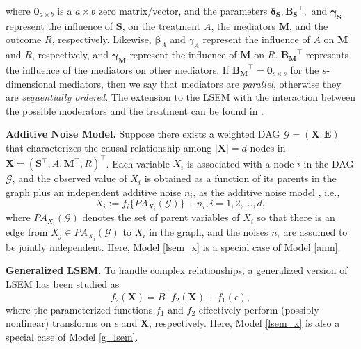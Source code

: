 where $\boldsymbol{0}_{a\times b}$ is a $a\times b$ zero matrix/vector, and the parameters $\boldsymbol{\delta_S},\boldsymbol{B_S}^\top,$ and $\boldsymbol{\gamma_S}$ represent the influence of $\boldsymbol{S}$, on the treatment $A$, the mediators $\boldsymbol{M}$, and the outcome $R$, respectively. Likewise, $\boldsymbol{\beta}_A$ and $\gamma_A$ represent the influence of $A$ on $\boldsymbol{M}$ and $R$, respectively, and $\boldsymbol{\gamma_M}$ represent the influence of $\boldsymbol{M}$ on $R$. $\boldsymbol{B_M}^\top$ represents the influence of the mediators on other mediators. If $\boldsymbol{B_M}^\top = \boldsymbol{0}_{s\times s}$ for the $s$-dimensional mediators, then we say that mediators are \textit{parallel}, otherwise they are \textit{sequentially ordered}. The extension to the \acrshort{LSEM} with the interaction between the possible moderators and the treatment can be found in \citet{watson2023heterogeneous}.

\smallskip

\noindent\textbf{Additive Noise Model.} 
Suppose there exists a weighted DAG $\mathcal{G}=(\boldsymbol{X},\mathbf{E})$ that characterizes the causal relationship among $|\boldsymbol{X}|=d$ nodes in $\boldsymbol{X} = (\boldsymbol{S}^{\top}, A, \boldsymbol{M}^\top, R)^\top$. Each variable $X_i$ is associated with a node $i$ in the \acrshort{DAG} $\mathcal{G}$, and the observed value of $X_i$ is obtained as a function of its parents in the graph plus an independent additive noise $n_i$, as the additive noise model \citep{buhlmann2014cam}, i.e., 
\begin{equation}\label{anm}
X_i := f_i\{PA_{X_i} (\mathcal{G})\} + n_i,i = 1,2,...,d, 
\end{equation}
where $PA_{X_i} (\mathcal{G})$ denotes the set of parent variables of $X_i$ so that there is an edge from $X_j\in PA_{X_i} (\mathcal{G})$ to $X_i$ in the graph, and the noises $n_i$ are assumed to be jointly independent. Here, Model \eqref{lsem_x} is a special case of Model \eqref{anm}. 

\smallskip

\noindent\textbf{Generalized \acrshort{LSEM}.} 
To handle complex relationships, a generalized version of LSEM has been studied \citep{yu2019dag} as
\begin{equation}\label{g_lsem}
f_2(\boldsymbol{X})=B^\top f_2(\boldsymbol{X}) +f_1(\epsilon),
\end{equation}
where the parameterized functions $f_1$ and $f_2$ effectively perform (possibly nonlinear) transforms on $\epsilon$ and $\boldsymbol{X}$, respectively. Here, Model \eqref{lsem_x} is also a special case of Model \eqref{g_lsem}. 

